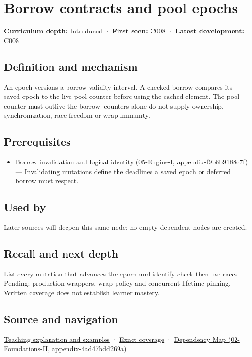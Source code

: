 \hypertarget{appendix-aa405b7c3903}{}
\section{Borrow contracts and pool epochs}\label{appendix-aa405b7c3903-borrow-contracts-and-pool-epochs}

\textbf{Curriculum depth:} Introduced · \textbf{First seen:} C008 · \textbf{Latest development:} C008

\subsection{Definition and mechanism}\label{appendix-aa405b7c3903-definition-and-mechanism}

An epoch versions a borrow-validity interval. A checked borrow compares its saved epoch to the live pool counter before using the cached element. The pool counter must outlive the borrow; counters alone do not supply ownership, synchronization, race freedom or wrap immunity.

\subsection{Prerequisites}\label{appendix-aa405b7c3903-prerequisites}

\begin{itemize}
\tightlist
\item
  \href{../05-Engine-I/main.pdf\#nameddest=appendix-f9b8b9188c7f}{Borrow invalidation and logical identity (05-Engine-I, appendix-f9b8b9188c7f)} --- Invalidating mutations define the deadlines a saved epoch or deferred borrow must respect.
\end{itemize}

\subsection{Used by}\label{appendix-aa405b7c3903-used-by}

Later sources will deepen this same node; no empty dependent nodes are created.

\subsection{Recall and next depth}\label{appendix-aa405b7c3903-recall-and-next-depth}

List every mutation that advances the epoch and identify check-then-use races. Pending: production wrappers, wrap policy and concurrent lifetime pinning. Written coverage does not establish learner mastery.

\subsection{Source and navigation}\label{appendix-aa405b7c3903-source-and-navigation}

\hyperref[01-foundations-i-ch003-when-a-valid-borrow-stops-naming-the-intended-thing]{Teaching explanation and examples} · \hyperref[appendix-fd090d982a15-m008---parts-113-126]{Exact coverage} · \href{../02-Foundations-II/main.pdf\#nameddest=appendix-4ad47bdd269a}{Dependency Map (02-Foundations-II, appendix-4ad47bdd269a)}
